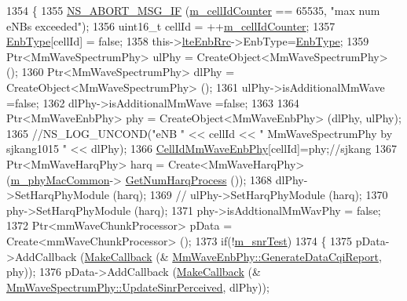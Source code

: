 \begin{DoxyCode}
1354 \{
1355         \hyperlink{group__fatal_ga6653324225bc139e46deea177614ceee}{NS\_ABORT\_MSG\_IF} (\hyperlink{classns3_1_1MmWaveHelper_a8386109fad3e913312ba2833c0116ea8}{m\_cellIdCounter} == 65535, \textcolor{stringliteral}{"max num eNBs exceeded"});
1356         uint16\_t cellId = ++\hyperlink{classns3_1_1MmWaveHelper_a8386109fad3e913312ba2833c0116ea8}{m\_cellIdCounter};
1357     \hyperlink{classns3_1_1MmWaveHelper_a5da34e3048341219417e4e2c154527e5}{EnbType}[cellId] = \textcolor{keyword}{false};
1358     this->\hyperlink{classns3_1_1MmWaveHelper_a877dec693e5e6669a413ef40e6f7f873}{lteEnbRrc}->EnbType=\hyperlink{classns3_1_1MmWaveHelper_a5da34e3048341219417e4e2c154527e5}{EnbType};
1359         Ptr<MmWaveSpectrumPhy> ulPhy = CreateObject<MmWaveSpectrumPhy> ();
1360         Ptr<MmWaveSpectrumPhy> dlPhy = CreateObject<MmWaveSpectrumPhy> ();
1361         ulPhy->isAdditionalMmWave =\textcolor{keyword}{false};
1362         dlPhy->isAdditionalMmWave =\textcolor{keyword}{false};
1363 
1364         Ptr<MmWaveEnbPhy> phy = CreateObject<MmWaveEnbPhy> (dlPhy, ulPhy);
1365         \textcolor{comment}{//NS\_LOG\_UNCOND("eNB " << cellId << " MmWaveSpectrumPhy by sjkang1015 " << dlPhy);}
1366     \hyperlink{classns3_1_1MmWaveHelper_af1bd1010ff8be40be5e86c076acf116d}{CellIdMmWaveEnbPhy}[cellId]=phy;\textcolor{comment}{//sjkang}
1367         Ptr<MmWaveHarqPhy> harq = Create<MmWaveHarqPhy> (\hyperlink{classns3_1_1MmWaveHelper_a6aaa35de743b9a88998de0128b1046b4}{m\_phyMacCommon}->
      \hyperlink{classns3_1_1MmWavePhyMacCommon_a40773d84172ebeb5aff125f56ebcc5ac}{GetNumHarqProcess} ());
1368         dlPhy->SetHarqPhyModule (harq);
1369 \textcolor{comment}{//      ulPhy->SetHarqPhyModule (harq);}
1370         phy->SetHarqPhyModule (harq);
1371         phy->isAddtionalMmWavPhy = \textcolor{keyword}{false};
1372         Ptr<mmWaveChunkProcessor> pData = Create<mmWaveChunkProcessor> ();
1373         \textcolor{keywordflow}{if}(!\hyperlink{classns3_1_1MmWaveHelper_a8e31c7897807a6d5e9b7acd29cccaf01}{m\_snrTest})
1374         \{
1375                 pData->AddCallback (\hyperlink{group__makecallbackmemptr_ga9376283685aa99d204048d6a4b7610a4}{MakeCallback} (&
      \hyperlink{classns3_1_1MmWaveEnbPhy_a016525ae90876006ff14b0a73c9a33a4}{MmWaveEnbPhy::GenerateDataCqiReport}, phy));
1376                 pData->AddCallback (\hyperlink{group__makecallbackmemptr_ga9376283685aa99d204048d6a4b7610a4}{MakeCallback} (&
      \hyperlink{classns3_1_1MmWaveSpectrumPhy_ad00477c4185055c7fb2b717bb42fd668}{MmWaveSpectrumPhy::UpdateSinrPerceived}, dlPhy));

\end{DoxyCode}
